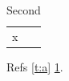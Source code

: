 \documentclass{article}
\begin{document}
\listoftables

\begin{table}
\caption{First}\label{t:a}
\begin{tabular}{l} x \end{tabular}
\caption{Second}\label{t:b}
\end{table}

Refs \ref{t:a} \ref{t:b}.
\end{document}
